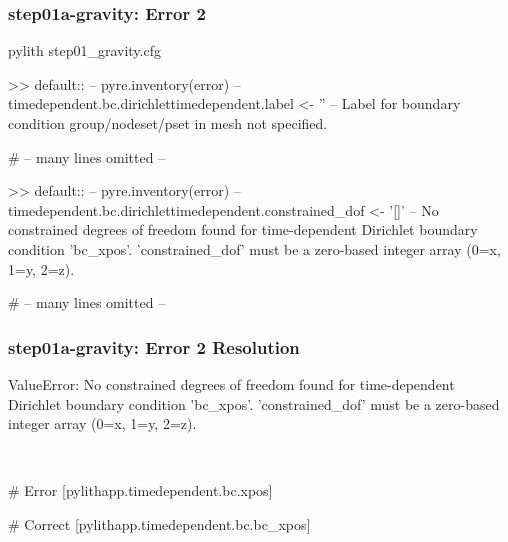 \documentclass[aspectratio=169]{beamer}
\begin{document}
\begin{frame}[fragile]
  \frametitle{{\ttfamily step01a-gravity}: Error 2}

\begin{bashcode}
pylith step01_gravity.cfg

 >> {default}::
 -- pyre.inventory(error)
 -- timedependent.bc.dirichlettimedependent.label <- ''
 -- Label for boundary condition group/nodeset/pset in mesh not specified.

 # -- many lines omitted --

  >> {default}::
 -- pyre.inventory(error)
 -- timedependent.bc.dirichlettimedependent.constrained_dof <- '[]'
 -- No constrained degrees of freedom found for time-dependent Dirichlet boundary condition 'bc_xpos'. 'constrained_dof' must be a zero-based integer array (0=x, 1=y, 2=z).

# -- many lines omitted --
\end{bashcode}

\end{frame}


\begin{frame}[t,fragile]
  \frametitle{{\ttfamily step01a-gravity}: Error 2 Resolution}

  \tserror
  \begin{bashcode}
    ValueError: No constrained degrees of freedom found for time-dependent Dirichlet boundary condition 'bc_xpos'.
    'constrained_dof' must be a zero-based integer array (0=x, 1=y, 2=z).
  \end{bashcode}

  \pause\\[1pt]

  \begin{cfgcode}
    # Error
    [pylithapp.timedependent.bc.xpos]

    # Correct
    [pylithapp.timedependent.bc.bc_xpos]
  \end{cfgcode}

\end{frame}
\end{document}
